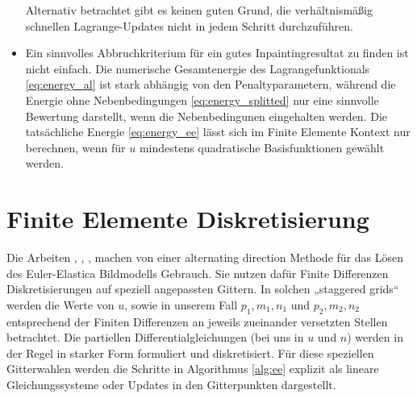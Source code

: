 \documentclass{mythesis}
\begin{document}
\begin{algorithm}
\begin{note}
\begin{itemize}
		Alternativ betrachtet gibt es keinen guten Grund, die verhältnismäßig schnellen Lagrange-Updates nicht in jedem Schritt durchzuführen.
	    \item %
		Ein sinnvolles Abbruchkriterium für ein gutes Inpaintingresultat zu finden ist nicht einfach.
		Die numerische Gesamtenergie des Lagrangefunktionals \eqref{eq:energy_al} ist stark abhängig von den Penaltyparametern, während die Energie ohne Nebenbedingungen \eqref{eq:energy_splitted} nur eine sinnvolle Bewertung darstellt, wenn die Nebenbedingunen eingehalten werden.
		Die tatsächliche Energie \eqref{eq:energy_ee} lässt sich im Finite Elemente Kontext nur berechnen, wenn für $u$ mindestens quadratische Basisfunktionen gewählt werden.

	\end{itemize}
    \end{note}
\end{algorithm}


\section{Finite Elemente Diskretisierung}

Die Arbeiten \cite{tai2011fast}, \cite{yashtini2015alternating}, \cite{hahn2011fast}, \cite{duan2013fast} machen von einer alternating direction Methode für das Lösen des Euler-Elastica Bildmodells Gebrauch.
Sie nutzen dafür Finite Differenzen Diskretisierungen auf speziell angepassten Gittern.
In solchen „staggered grids“ \cite{tai2011fast} werden die Werte von $u$, sowie in unserem Fall $p_1, m_1, n_1$ und $p_2, m_2, n_2$ entsprechend der Finiten Differenzen an jeweils zueinander versetzten Stellen betrachtet.
Die partiellen Differentialgleichungen (bei uns in $u$ und $n$) werden in der Regel in starker Form formuliert und diskretisiert.
Für diese speziellen Gitterwahlen werden die Schritte in Algorithmus \ref{alg:ee} explizit als lineare Gleichungssysteme oder Updates in den Gitterpunkten dargestellt.
\end{document}
